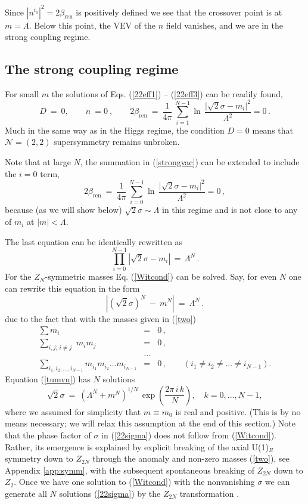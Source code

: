 \documentclass[epsfig,12pt]{article}
\def\beq{\begin{equation}}
\def\eeq{\end{equation}}
\def\beqn{\begin{eqnarray}}
\def\eeqn{\end{eqnarray}}
\newcommand{\zn}{$Z_N$}
\def\beqn{\begin{eqnarray}}
\def\eeqn{\end{eqnarray}}
\def\beq{\begin{equation}}
\def\eeq{\end{equation}}
\newcommand{\ntwot}{${\mathcal N}= \left(2,2\right) $ }
\newcommand{\bren}{{\beta_\text{ren}}}
\begin{document}
Since $|n^{i_0}|^2=2\bren$ is positively defined we see that the crossover point is
at $m=\Lambda$. Below this point, the VEV of the $n$ field vanishes,
 and we are in the strong coupling regime.

\subsection{The strong coupling regime}
\label{tscreg}

For small $m$ the
solutions of Eqs. (\ref{22eff1}) -- (\ref{22eff3}) can be readily found,
\beq
D~=~0,\qquad n~=0~,\qquad
2\bren~=~\frac{1}{4\pi}\, 
\sum_{i=1}^{N-1}\ln\, {\frac{\bigl|\sqrt{2}\sigma-m_i\bigr|^2}{\Lambda^2}}=0 \,.
\label{strongvac}
\eeq
Much in the same way as in the Higgs regime, the condition $D=0$ means that   \ntwot
 supersymmetry remains unbroken.
 
 Note that at large $N$, the summation in (\ref{strongvac}) can be extended to include the
 $i=0$ term,
 \beq
 2\bren~=~\frac{1}{4\pi}\, 
\sum_{i=0}^{N-1}\ln\, {\frac{\bigl|\sqrt{2}\sigma-m_i\bigr|^2}{\Lambda^2}}=0 \,,
\label{strongvacp}
 \eeq
because (as we will show below) $\sqrt{2}\sigma\sim \Lambda$ in this regime and is not
close to any of $m_i$ at $|m|<\Lambda$.

The last equation can be identically rewritten as 
\beq
\prod_{i=0}^{N-1}\left|\sqrt{2}\sigma-m_i\right| \,=\,\Lambda^N \,.
\label{Witcond}
\eeq
For the \zn-symmetric masses
Eq. (\ref{Witcond}) can be solved. Say, for even $N$ one can rewrite this equation in the form
\beq
\left|\left(\sqrt{2}\sigma\right)^N ~-~ m^N\right| ~=~ \Lambda^N \,.
\label{tumvn}
\eeq
due to the fact that with the masses given in (\ref{two})
\beqn
\sum m_i &=& 0\,,
\nonumber\\[2mm]
\sum_{i,j;\,i\neq j}\,\, m_i m_j &=& 0\,,
\nonumber\\[2mm]
&...&
\nonumber\\[2mm]
\sum_{i_1,i_2,...,i_{N-1}} m_{i_1} m_{i_2} ... m_{i_{N-1}} &=& 0\,,\qquad \left(i_1\neq i_2\neq ...\neq i_{N-1}\right).
\eeqn
Equation (\ref{tumvn})  has $N$ solutions
\beq
\sqrt{2}\sigma ~=~ \left(\Lambda^N+m^N\right)^{1/N}\,
\exp\left( \frac{2\pi\,i\, k}{N}
\right), \quad k=0, ..., N-1,
\label{22sigma}
\eeq
where we assumed for simplicity that $m\equiv m_0$ is real and positive.
(This is by no means necessary; we will relax this assumption at the end of this section.)
Note that the phase factor of $\sigma$ in (\ref{22sigma}) does not follow from (\ref{Witcond}). Rather, its emergence 
is explained by explicit breaking of the axial U(1)$_{R}$ symmetry down to
$Z_{2N}$ through the anomaly and non-zero masses (\ref{two}), see Appendix \ref{app:symm},
with the subsequent spontaneous breaking of $Z_{2N}$ down to $Z_2$. Once we have one solution to
(\ref{Witcond}) with the nonvanishing $\sigma$ we can generate all $N$ solutions (\ref{22sigma})
by the $Z_{2N}$ transformation \cite{W79}.
\end{document}
